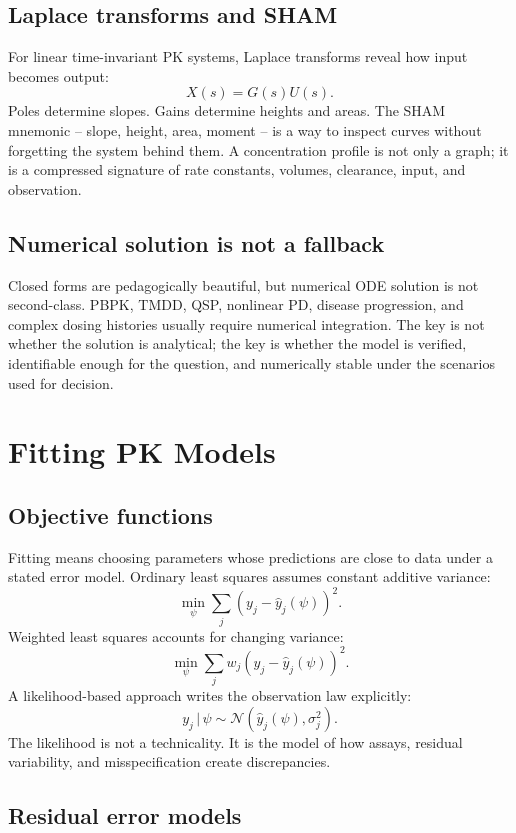 \documentclass[a4paper]{article}
\newcommand{\Normal}{\mathcal{N}}
\newcommand{\given}{\,|\,}
\begin{document}
\subsection{Laplace transforms and SHAM}

For linear time-invariant PK systems, Laplace transforms reveal how input becomes output:
\[
  X(s)=G(s)U(s).
\]
Poles determine slopes. Gains determine heights and areas. The SHAM mnemonic -- slope, height, area, moment -- is a way to inspect curves without forgetting the system behind them. A concentration profile is not only a graph; it is a compressed signature of rate constants, volumes, clearance, input, and observation.

\subsection{Numerical solution is not a fallback}

Closed forms are pedagogically beautiful, but numerical ODE solution is not second-class. PBPK, TMDD, QSP, nonlinear PD, disease progression, and complex dosing histories usually require numerical integration. The key is not whether the solution is analytical; the key is whether the model is verified, identifiable enough for the question, and numerically stable under the scenarios used for decision.

\section{Fitting PK Models}

\subsection{Objective functions}

Fitting means choosing parameters whose predictions are close to data under a stated error model. Ordinary least squares assumes constant additive variance:
\[
  \min_\psi \sum_j (y_j-\hat y_j(\psi))^2.
\]
Weighted least squares accounts for changing variance:
\[
  \min_\psi \sum_j w_j(y_j-\hat y_j(\psi))^2.
\]
A likelihood-based approach writes the observation law explicitly:
\[
  y_j\given \psi\sim \Normal(\hat y_j(\psi),\sigma^2_j).
\]
The likelihood is not a technicality. It is the model of how assays, residual variability, and misspecification create discrepancies.

\subsection{Residual error models}
\end{document}
